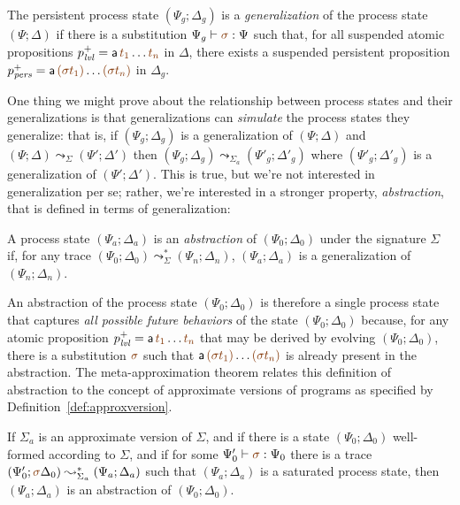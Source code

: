 \bigskip
\begin{definition}
  The persistent process state $(\Psi_g; \Delta_g)$ is a {\em
    generalization} of the process state $(\Psi; \Delta)$ if there is
  a substitution $\Psi_g \vdash \lf{\sigma} : \Psi$ such that, for all
  suspended atomic propositions $p^+_\mlvl = {\sf a}\,\lf{t_1}\ldots \lf{t_n}$
  in $\Delta$, there exists a suspended persistent proposition
  $p^+_\mpers = {\sf a}\,\lf{(\sigma t_1)}\ldots\lf{(\sigma t_n)}$ in
  $\Delta_g$.
\end{definition}
\bigskip

One thing we might prove about the relationship between process states
and their generalizations is that generalizations can {\it simulate}
the process states they generalize: that is, if $(\Psi_g;
\Delta_g)$ is a generalization of $(\Psi; \Delta)$ and $(\Psi; \Delta)
\leadsto_\Sigma (\Psi'; \Delta')$ then $(\Psi_g; \Delta_g)
\leadsto_{\Sigma_a} (\Psi'_g; \Delta'_g)$ where $(\Psi'_g; \Delta'_g)$
is a generalization of $(\Psi'; \Delta')$. This is true, but we're not
interested in generalization per se; rather, we're interested in a
stronger property, {\em abstraction}, that is defined in terms of
generalization:

\bigskip
\begin{definition}
A process state $(\Psi_a; \Delta_a)$ is an {\em abstraction} of 
$(\Psi_0; \Delta_0)$ under the signature $\Sigma$ if, for any trace
$(\Psi_0; \Delta_0) \leadsto^*_\Sigma (\Psi_n; \Delta_n)$, 
$(\Psi_a; \Delta_a)$ is a generalization of $(\Psi_n; \Delta_n)$. 
\end{definition}
\bigskip

An abstraction of the process state $(\Psi_0; \Delta_0)$ is therefore
a single process state that captures {\it all possible future
  behaviors} of the state $(\Psi_0; \Delta_0)$ because, for any atomic
proposition $p^+_\mlvl = {\sf a}\,\lf{t_1}\ldots \lf{t_n}$ that may be derived
by evolving $(\Psi_0; \Delta_0)$, there is a substitution $\lf\sigma$
such that ${\sf a}\,\lf{(\sigma t_1)}\ldots\lf{(\sigma t_n)}$ is already present
in the abstraction. The meta-approximation theorem relates this definition
of abstraction to the concept of approximate versions of programs as
specified by Definition~\ref{def:approxversion}.  

\bigskip
\begin{theorem}\label{thm:metapprox}
  If $\Sigma_a$ is an approximate version of $\Sigma$, and if there is a
  state $(\Psi_0; \Delta_0)$ well-formed according to $\Sigma$, and if
  for some $\Psi_0' \vdash \lf\sigma : \Psi_0$ there is a trace
  $(\Psi_0'; \lf\sigma\Delta_0) \leadsto^*_{\Sigma_a} (\Psi_a; \Delta_a)$
  such that $(\Psi_a; \Delta_a)$ is a saturated process state, then
  $(\Psi_a; \Delta_a)$ is an abstraction of $(\Psi_0; \Delta_0)$.
\end{theorem}

